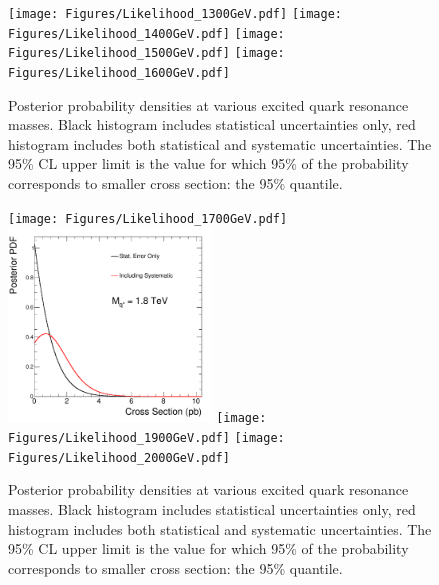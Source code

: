 \clearpage

\begin{figure}[!ht]
  \begin{center}
     \texttt{[image: Figures/Likelihood\_1300GeV.pdf]}
     \texttt{[image: Figures/Likelihood\_1400GeV.pdf]}
     \texttt{[image: Figures/Likelihood\_1500GeV.pdf]}
     \texttt{[image: Figures/Likelihood\_1600GeV.pdf]}
 \caption{Posterior probability densities at
 various excited quark resonance masses.  Black histogram includes statistical
 uncertainties only, red histogram includes both statistical and systematic
 uncertainties. The 95\% CL upper limit is the value for which 95\% of 
 the probability corresponds to smaller cross section: the 95\% quantile.}
    \label{likeli3}
  \end{center}
\end{figure}

\clearpage

\begin{figure}[!ht]
  \begin{center}
     \texttt{[image: Figures/Likelihood\_1700GeV.pdf]}
     \includegraphics[width=0.48\textwidth]{Figures/Likelihood_1800GeV.pdf}
     \texttt{[image: Figures/Likelihood\_1900GeV.pdf]}
     \texttt{[image: Figures/Likelihood\_2000GeV.pdf]}
 \caption{Posterior probability densities at
 various excited quark resonance masses.  Black histogram includes statistical
 uncertainties only, red histogram includes both statistical and systematic
 uncertainties. The 95\% CL upper limit is the value for which 95\% of 
 the probability corresponds to smaller cross section: the 95\% quantile.}
    \label{likeli4}
  \end{center}
\end{figure}

\clearpage

